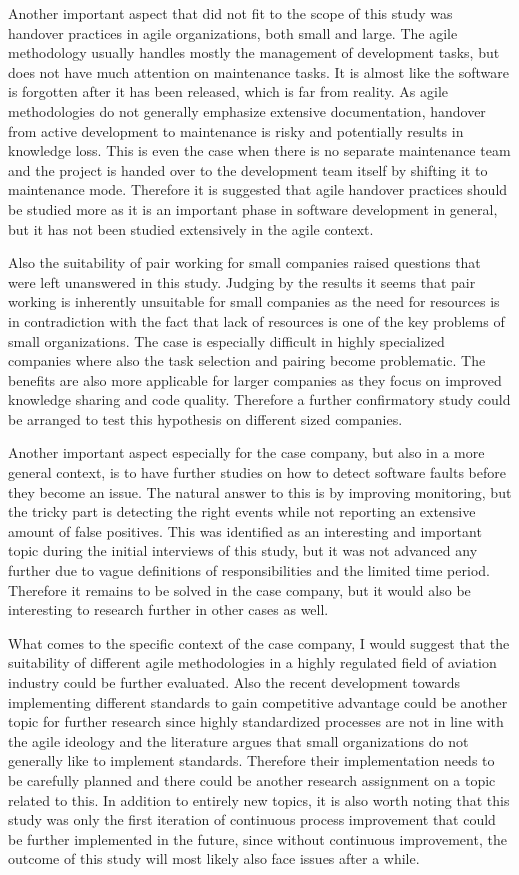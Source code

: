 Another important aspect that did not fit to the scope of this study was handover practices in agile organizations, both small and large. The agile methodology usually handles mostly the management of development
tasks, but does not have much attention on maintenance tasks. It is almost like the software is forgotten after it has been released, which is far from reality. As agile methodologies do not generally emphasize 
extensive documentation, handover from active development to maintenance is risky and potentially results in knowledge loss. This is even the case when there is no separate maintenance team and the project
is handed over to the development team itself by shifting it to maintenance mode. Therefore it is suggested that agile handover practices should be studied more as it is an important phase in 
software development in general, but it has not been studied extensively in the agile context.

Also the suitability of pair working for small companies raised questions that were left unanswered in this study. Judging by the results it seems that pair working is inherently unsuitable for small companies
as the need for resources is in contradiction with the fact that lack of resources is one of the key problems of small organizations. The case is especially difficult in highly specialized companies where also
the task selection and pairing become problematic. The benefits are also more applicable for larger companies as they focus
on improved knowledge sharing and code quality. Therefore a further confirmatory study could be arranged to test this hypothesis on different sized companies.

Another important aspect especially for the case company, but also in a more general context, is to have further studies on how to detect software faults before they become an issue. The natural answer to this
is by improving monitoring, but the tricky part is detecting the right events while not reporting an extensive amount of false positives. This was identified as an interesting and important topic during the 
initial interviews of this study, but it was not advanced any further due to vague definitions of responsibilities and the limited time period. Therefore it remains to be solved in the case company, but it would
also be interesting to research further in other cases as well.

What comes to the specific context of the case company, I would suggest that the suitability of different agile methodologies in a highly regulated field of aviation industry could be further evaluated. Also the
recent development towards implementing different standards to gain competitive advantage could be another topic for further research since highly standardized processes are not in line with the agile ideology
and the literature argues that small organizations do not generally like to implement standards. Therefore their implementation needs to be carefully planned and there could be another research assignment on a topic
related to this. In addition to entirely new topics, it is also worth noting that this study was only the first iteration of continuous process improvement that could be further implemented in the future, since
without continuous improvement, the outcome of this study will most likely also face issues after a while.
